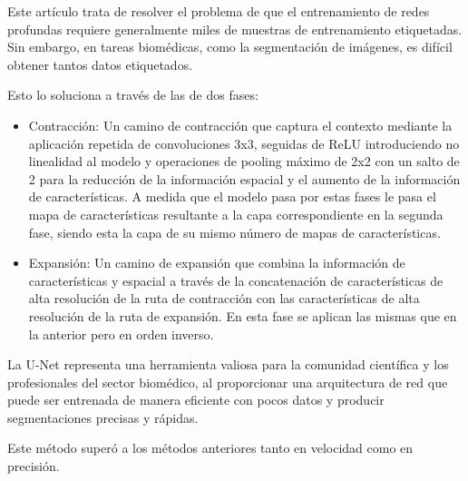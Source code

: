 Este artículo trata de resolver el problema de que el entrenamiento de redes profundas requiere generalmente miles de muestras de entrenamiento etiquetadas. Sin embargo, en tareas biomédicas, como la segmentación de imágenes, es difícil obtener tantos datos etiquetados.

Esto lo soluciona a través de las de dos fases:

\begin{itemize}
	
	\item{Contracción}: Un camino de contracción que captura el contexto mediante la aplicación repetida de convoluciones 3x3, seguidas de ReLU introduciendo no linealidad al modelo y operaciones de pooling máximo de 2x2 con un salto de 2 para la reducción de la información espacial y el aumento de la información de características. A medida que el modelo pasa por estas fases le pasa el mapa de características resultante a la capa correspondiente en la segunda fase, siendo esta la capa de su mismo número de mapas de características.
	
	\item{Expansión}: Un camino de expansión que combina la información de características y espacial a través de la concatenación de características de alta resolución de la ruta de contracción con las características de alta resolución de la ruta de expansión.
	En esta fase se aplican las mismas que en la anterior pero en orden inverso.
	
\end{itemize}

La U-Net representa una herramienta valiosa para la comunidad científica y los profesionales del sector biomédico, al proporcionar una arquitectura de red que puede ser entrenada de manera eficiente con pocos datos y producir segmentaciones precisas y rápidas.

Este método superó a los métodos anteriores tanto en velocidad como en precisión.
